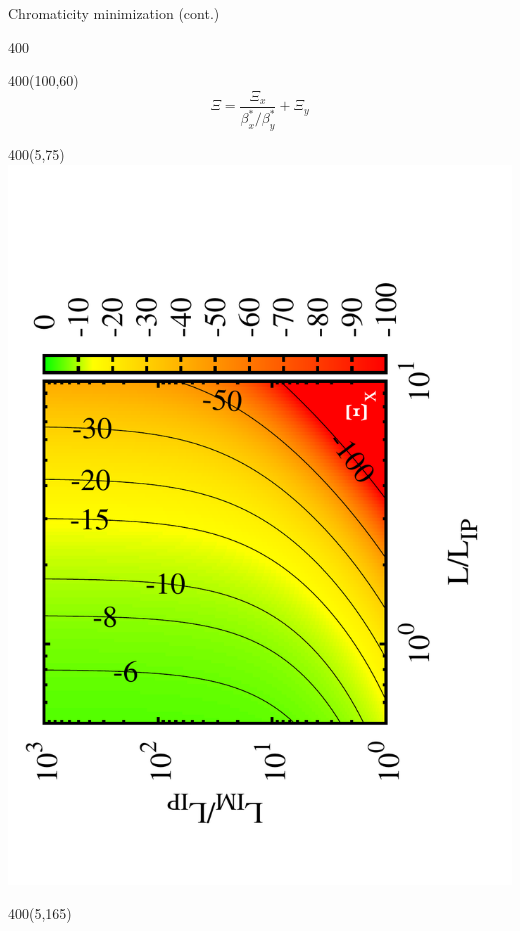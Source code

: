 \documentclass{beamer}
\begin{document}
\begin{frame}{Chromaticity minimization (cont.)}
\begin{textblock}{400}
 \end{textblock}
 \begin{textblock}{400}(100,60)
 \begin{equation}
  \Xi=\frac{\Xi_x}{\beta_x^*/\beta_y^*}+\Xi_y
 \end{equation}
\end{textblock}
\begin{textblock}{400}(5,75)
 \includegraphics[scale=0.20,angle=-90]{Xi_xa.pdf}
\end{textblock}
\begin{textblock}{400}(5,165)

\end{textblock}
\end{frame}
\end{document}
